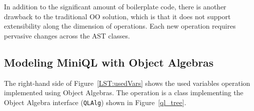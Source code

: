 \begin{figure*}[t]
  \nocaptionrule
  \begin{minipage}[t]{0.48\textwidth}
  \end{minipage}
  \vline
  \hspace*{2pt}
  \begin{minipage}[t]{0.48\textwidth}
  \end{minipage}

    \caption{Implementing the ``used variables'' operation using traditional ASTs (left) and Object Algebras (right).}\label{LST:usedVars}
\end{figure*}


In addition to the significant amount of boilerplate code, there is
another drawback to the traditional OO solution, which is that it does
not support extensibility along the dimension of operations. Each new
operation requires pervasive changes across the AST classes.


\subsection{Modeling MiniQL with Object Algebras}\label{subsec:model_ql_with_oa}


The right-hand side of Figure~\ref{LST:usedVars} shows the used
variables operation implemented using Object Algebras. The operation
is a class implementing the Object Algebra interface
(\lstinline{QLAlg}) shown in Figure~\ref{ql_tree}.


